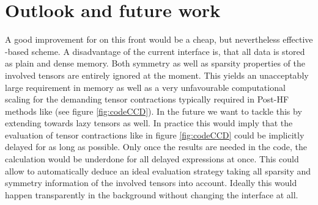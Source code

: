 \chapter{Outlook and future work}







A good improvement for \molsturm on this front would be a cheap,
but nevertheless effective \contraction-based \SCF scheme.
%
%
A disadvantage of the current \molsturm interface is,
that all data is stored as plain and dense memory.
Both symmetry as well as sparsity properties of the involved tensors
are entirely ignored at the moment.
This yields an unacceptably large requirement in memory
as well as a very unfavourable computational scaling
for the demanding tensor contractions
typically required in Post-HF methods like \CCD (see figure \ref{fig:codeCCD}).
In the future we want to tackle this by extending
\lazyten towards lazy tensors as well.
In practice this would imply that the evaluation of
tensor contractions like in figure \ref{fig:codeCCD} could be implicitly delayed
for as long as possible.
Only once the results are needed in the code,
the calculation would be underdone
for all delayed expressions at once.
This could allow to automatically deduce an ideal evaluation strategy
taking all sparsity and symmetry information
of the involved tensors into account.
Ideally this would happen transparently in the background
without changing the \python interface at all.

